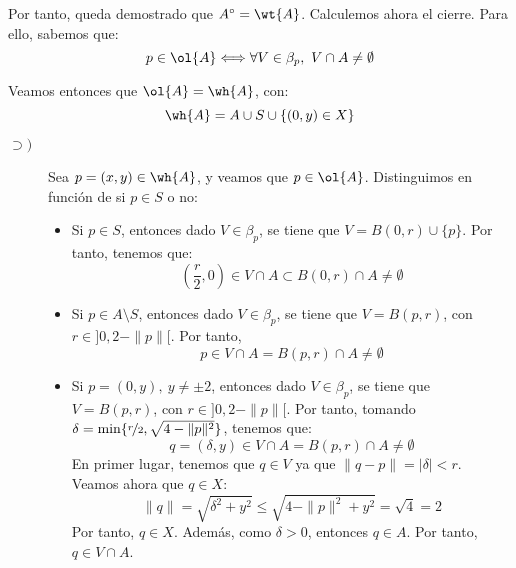 \documentclass[12pt]{article}
\begin{document}
\begin{ejercicio}[5 puntos]
\begin{enumerate}
          Por tanto, queda demostrado que $A^\circ = \wt{A}$. Calculemos ahora el cierre. Para ello, sabemos que:
          \begin{equation*}
            p\in \ol{A} \Longleftrightarrow \forall V\in \beta_p,~V\cap A \neq \emptyset
          \end{equation*}
          
          Veamos entonces que $\ol{A}=\wh{A}$, con:
          \begin{equation*}
            \wh{A} = A \cup S \cup \{(0,y)\in X\}
          \end{equation*}
          \begin{description}
            \item[$\supset)$] Sea $p=(x,y)\in \wh{A}$, y veamos que $p\in \ol{A}$. Distinguimos en
            función de si $p\in S$ o no:
            \begin{itemize}
              \item Si $p\in S$, entonces dado $V\in \beta_p$, se tiene que $V=B(0,r)\cup \{p\}$.
              Por tanto, tenemos que:
              \begin{equation*}
                \left(\frac{r}{2}, 0\right) \in V\cap A \subset B(0,r)\cap A \neq \emptyset
              \end{equation*}

              \item Si $p\in A\setminus S$, entonces dado $V\in \beta_p$, se tiene que $V=B(p,r)$, con $r\in ]0,2-\|p\|[$. Por tanto,
              \begin{equation*}
                p\in V\cap A = B(p,r)\cap A \neq \emptyset
              \end{equation*}

              \item Si $p=(0,y),~y\neq \pm 2$, entonces dado $V\in \beta_p$, se tiene que $V=B(p,r)$, con $r\in ]0,2-\|p\|[$.
              Por tanto, tomando $\delta = \min \{\nicefrac{r}{2}, \sqrt{4-\|p\|^2}\}$, tenemos que:
              \begin{equation*}
                q = \left(\delta, y\right) \in V\cap A = B(p,r)\cap A \neq \emptyset
              \end{equation*}
              En primer lugar, tenemos que $q\in V$ ya que $\|q-p\|=|\delta|<r$. Veamos ahora que $q\in X$:
              \begin{equation*}
                \|q\| = \sqrt{\delta^2 + y^2}
                \leq \sqrt{{4-\|p\|^2} + y^2}
                = \sqrt{4} = 2
              \end{equation*}
              Por tanto, $q\in X$. Además, como $\delta > 0$, entonces $q\in A$. Por tanto, $q\in V\cap A$.


\end{itemize}
\end{description}
\end{enumerate}
\end{ejercicio}
\end{document}
